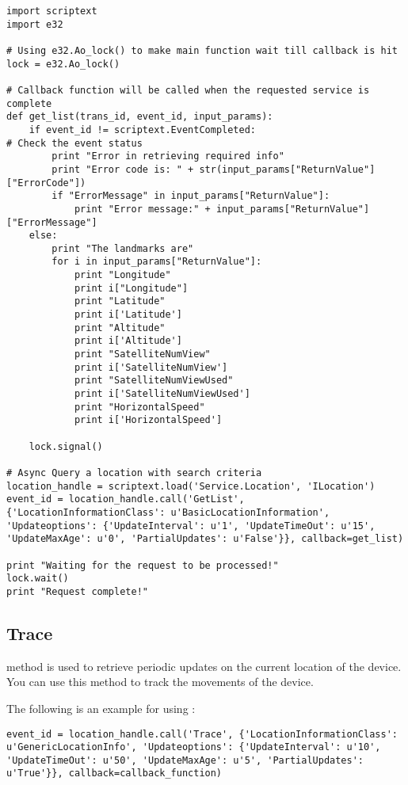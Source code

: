 \begin{verbatim}
import scriptext
import e32

# Using e32.Ao_lock() to make main function wait till callback is hit
lock = e32.Ao_lock()

# Callback function will be called when the requested service is complete
def get_list(trans_id, event_id, input_params):
    if event_id != scriptext.EventCompleted:   
# Check the event status
        print "Error in retrieving required info"
        print "Error code is: " + str(input_params["ReturnValue"]["ErrorCode"])
        if "ErrorMessage" in input_params["ReturnValue"]:
            print "Error message:" + input_params["ReturnValue"]["ErrorMessage"]
    else:
        print "The landmarks are"
        for i in input_params["ReturnValue"]:
            print "Longitude"
            print i["Longitude"]
            print "Latitude"
            print i['Latitude']
            print "Altitude"
            print i['Altitude']
            print "SatelliteNumView"
            print i['SatelliteNumView']
            print "SatelliteNumViewUsed"
            print i['SatelliteNumViewUsed']
            print "HorizontalSpeed"
            print i['HorizontalSpeed']

    lock.signal()

# Async Query a location with search criteria
location_handle = scriptext.load('Service.Location', 'ILocation')
event_id = location_handle.call('GetList', {'LocationInformationClass': u'BasicLocationInformation', 'Updateoptions': {'UpdateInterval': u'1', 'UpdateTimeOut': u'15', 'UpdateMaxAge': u'0', 'PartialUpdates': u'False'}}, callback=get_list)

print "Waiting for the request to be processed!"
lock.wait()
print "Request complete!"
\end{verbatim}

\subsection{Trace}
\label{subsec:localtrace}

 method is used to retrieve periodic updates on the current location of the device. You can use this method to track the movements of the device.

The following is an example for using :

\begin{verbatim}
event_id = location_handle.call('Trace', {'LocationInformationClass': u'GenericLocationInfo', 'Updateoptions': {'UpdateInterval': u'10', 'UpdateTimeOut': u'50', 'UpdateMaxAge': u'5', 'PartialUpdates': u'True'}}, callback=callback_function)
\end{verbatim}

